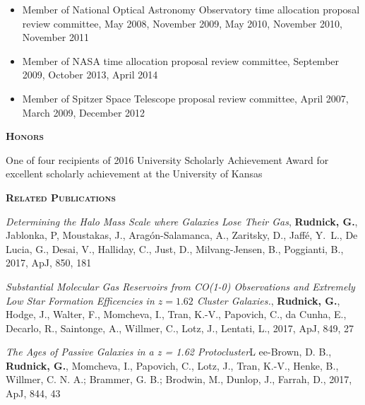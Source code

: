 \documentclass[11pt]{article}
\begin{document}
\begin{itemize}
\item Member of National Optical Astronomy Observatory
  time allocation proposal review committee, May 2008,
  November 2009, May 2010, November 2010, November 2011

\item Member of NASA time allocation proposal review committee,
  September 2009, October 2013, April 2014

\item Member of Spitzer Space Telescope proposal review committee, April 2007,
  March 2009, December 2012

\end{itemize}

\begin{flushleft}
\vspace{-0.1in}
{\large {\bf \textsc{Honors}}
\hrulefill}
\end{flushleft}

\vspace{-0.1in}
One of four recipients of 2016 University Scholarly Achievement Award for excellent scholarly achievement at the University of Kansas

\begin{flushleft}
\vspace{-0.1in}
{\large {\bf \textsc{Related Publications}}
\hrulefill}
\end{flushleft}

\vspace{-0.07in}
\hangindent=1.5cm  
{\it Determining the Halo Mass Scale where Galaxies Lose Their Gas}, {\bf Rudnick, G.}, Jablonka, P, Moustakas, J., Arag\'on-Salamanca, A., Zaritsky, D., Jaff\'e, Y.~L., De Lucia, G., Desai, V., Halliday, C., Just, D., Milvang-Jensen, B., Poggianti, B., 2017, ApJ, 850, 181

\hangindent=1.5cm  
{\it Substantial Molecular Gas Reservoirs from CO(1-0) Observations and Extremely Low Star Formation Efficencies in $z=1.62$ Cluster Galaxies.}, {\bf Rudnick, G.}, Hodge, J., Walter, F., Momcheva, I., Tran, K.-V., Papovich, C., da Cunha, E., Decarlo, R., Saintonge, A., Willmer, C., Lotz, J., Lentati, L., 2017, ApJ, 849, 27

\hangindent=1.5cm  
{\it The Ages of Passive Galaxies in a z = 1.62 Protocluster}L ee-Brown, D. B., {\bf Rudnick, G.}, Momcheva, I., Papovich, C., Lotz, J., Tran, K.-V., Henke, B., Willmer, C. N. A.; Brammer, G. B.; Brodwin, M., Dunlop, J., Farrah, D., 2017, ApJ, 844, 43
\end{document}
